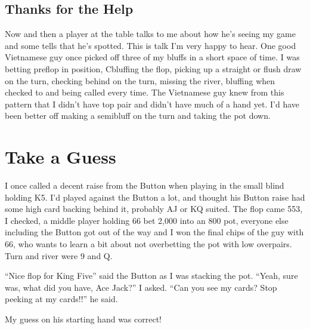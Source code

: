 \subsection*{Thanks for the Help}

Now and then a player at the table talks to me about how he's seeing my
game and some tells that he's spotted. This is talk I'm very happy to
hear. One good Vietnamese guy once picked off three of my bluffs in a short
space of time. I was betting preflop in position, Cbluffing the flop, 
picking up a straight or flush draw on the turn, checking behind on the turn,
missing the river, bluffing when checked to and being called every time.
The Vietnamese guy knew from this pattern that I didn't have top pair
and didn't have much of a hand yet. I'd have been better off making a semibluff
on the turn and taking the pot down.

\section{Take a Guess}

I once called a decent raise from the Button when playing in the small
blind holding K5. I'd played against the Button a lot, and thought
his Button raise had some high card backing behind it, probably AJ or
KQ suited. The flop came 553, I checked, a middle player holding 66
bet 2,000 into an 800 pot, everyone else including the Button got
out of the way and I won the final chips of the guy with 66, who wants
to learn a bit about not overbetting the pot with low overpairs. Turn
and river were 9 and Q.

``Nice flop for King Five'' said the Button as I was stacking the pot.
``Yeah, sure was, what did you have, Ace Jack?'' I asked. 
``Can you see my cards? Stop peeking at my cards!!'' he said. 

My guess on his starting hand was correct!

